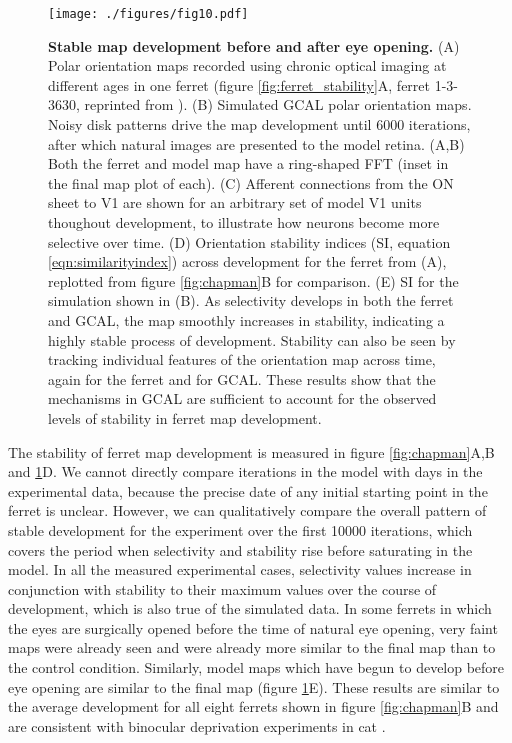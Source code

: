 \documentclass{article}
\def \scalefactor {0.666666}
\def \NoisytoNaturalScale {\scalefactor}   %
\begin{document}
\begin{figure}
\centerline{
\texttt{[image: ./figures/fig10.pdf]}
}
\caption[Stable map development before and after eye opening]
        {\textbf{Stable map development before and after eye opening.}
          (A) Polar orientation maps recorded using chronic optical
          imaging at different ages in one ferret (figure
          \ref{fig:ferret_stability}A, ferret 1-3-3630, reprinted from
          \citet{Chapman1996}). (B) Simulated GCAL polar orientation maps.
          Noisy disk patterns drive the map development until 6000
          iterations, after which natural images are presented to the
          model retina.  (A,B) Both the ferret and model map have a
          ring-shaped FFT (inset in the final map plot of each).  (C)
          Afferent connections from the ON sheet to V1 are shown for
          an arbitrary set of model V1 units thoughout development, to
          illustrate how neurons become more selective over time.
          (D) Orientation stability indices (SI, equation
          \ref{eqn:similarityindex}) across development for the ferret
          from (A), replotted from figure \ref{fig:chapman}B for
          comparison.  (E) SI for the simulation shown in (B).
          As selectivity develops in both the ferret and GCAL, the map
          smoothly increases in stability, indicating a highly stable
          process of development.  Stability can also be seen by
          tracking individual features of the orientation map across
          time, again for the ferret and for GCAL.  These results show
          that the mechanisms in GCAL are sufficient to account for
          the observed levels of stability in ferret map development.
}
\label{fig:noisytonatural}
\end{figure}

The stability of ferret map development is measured in figure
\ref{fig:chapman}A,B and \ref{fig:noisytonatural}D.  We cannot
directly compare iterations in the model with days in the experimental
data, because the precise date of any initial starting point in the
ferret is unclear. However, we can qualitatively compare the overall
pattern of stable development for the experiment over the first 10000
iterations, which covers the period when selectivity and stability
rise before saturating in the model. In all the measured experimental
cases, selectivity values increase in conjunction with stability to
their maximum values over the course of development, which is also
true of the simulated data. In some ferrets in which the eyes are
surgically opened before the time of natural eye opening, very faint
maps were already seen and were already more similar to the final map
than to the control condition. Similarly, model maps which have begun
to develop before eye opening are similar to the final map (figure
\ref{fig:noisytonatural}E). These results are similar to the average
development for all eight ferrets shown in figure \ref{fig:chapman}B
and are consistent with binocular deprivation experiments in cat
\citep{Crair1998}.
\end{document}
